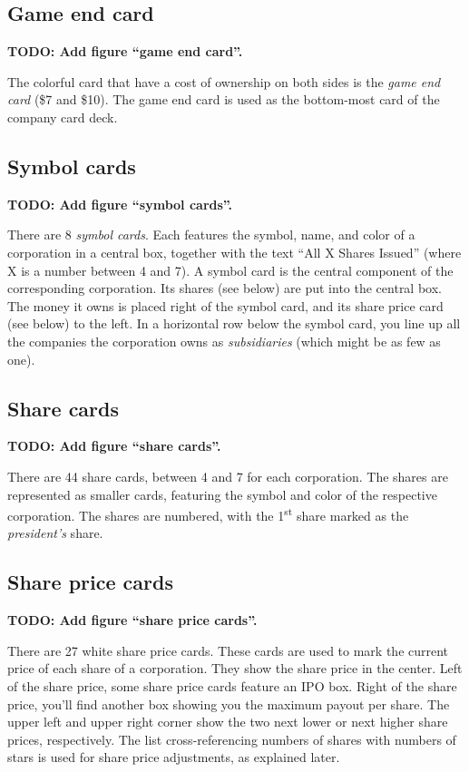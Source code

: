 \documentclass[10pt,final]{report}
\begin{document}
\begin{multicols}{2}
\subsection{Game end card}

\textbf{TODO: Add figure ``game end card''.}

The colorful card that have a cost of ownership on both sides is the
\emph{game end card} (\$7 and \$10). The game end card is used as the
bottom-most card of the company card deck.

\subsection{Symbol cards}

\textbf{TODO: Add figure ``symbol cards''.}

There are 8 \emph{symbol cards}. Each features the symbol, name, and
color of a corporation in a central box, together with the text ``All
X Shares Issued'' (where X is a number between 4 and 7). A
symbol card is the central component of the corresponding
corporation. Its shares (see below) are put into the central box. The
money it owns is placed right of the symbol card, and its share price
card (see below) to the left. In a horizontal row below the symbol
card, you line up all the companies the corporation owns as
\emph{subsidiaries} (which might be as few as one).

\subsection{Share cards}

\textbf{TODO: Add figure ``share cards''.}

There are 44 share cards, between 4 and 7 for each corporation. The
shares are represented as smaller cards, featuring the symbol and
color of the respective corporation. The shares are numbered, with the
1\textsuperscript{st} share marked as the \emph{president's} share.

\subsection{Share price cards}

\textbf{TODO: Add figure ``share price cards''.}

There are 27 white share price cards. These cards are used to mark the
current price of each share of a corporation. They show the share
price in the center. Left of the share price, some share price cards
feature an IPO box. Right of the share price, you'll find another box
showing you the maximum payout per share. The upper left and upper
right corner show the two next lower or next higher share prices,
respectively. The list cross-referencing numbers of shares with
numbers of stars is used for share price adjustments, as explained
later.


\end{multicols}
\end{document}
